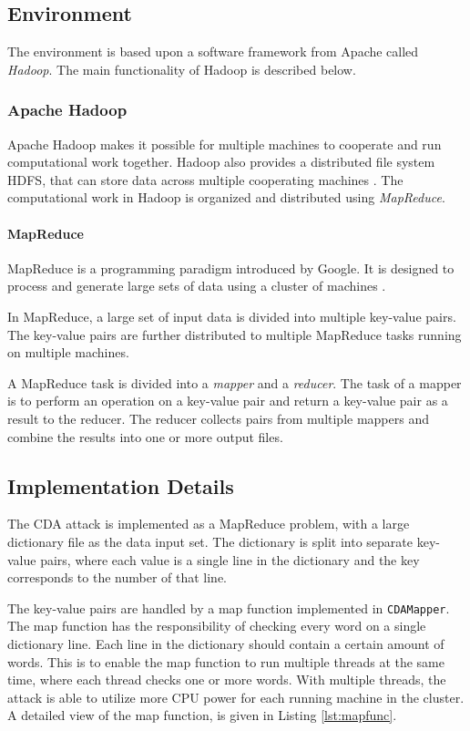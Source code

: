 \documentclass[pdftex,english,10pt,b5paper,twoside]{book}
\begin{document}
\subsection{Environment}

The environment is based upon a software framework from Apache called
\emph{Hadoop}. The main functionality of Hadoop is described below.

\subsubsection{Apache Hadoop}

Apache Hadoop makes it possible for multiple machines to cooperate
and run computational work together. Hadoop also provides a distributed file system
\ac{HDFS}, that can store data across multiple cooperating machines \cite{hadoop}. The
computational work in Hadoop is organized and distributed using \emph{MapReduce}.

\paragraph{MapReduce} MapReduce is a programming paradigm introduced by Google.
It is designed to process and generate large sets of data using a cluster of
machines \cite{mapred}.

In MapReduce, a large set of input data is divided into multiple key-value
pairs. The key-value pairs are further distributed to multiple MapReduce tasks
running on multiple machines.

A MapReduce task is divided into a \emph{mapper} and a \emph{reducer}. The task
of a mapper is to perform an operation on a key-value pair and return a
key-value pair as a result to the reducer. The reducer collects pairs
from multiple mappers and combine the results into one or more output files.

\subsection{Implementation Details}

The \ac{CDA} attack is implemented as a MapReduce problem, with a large
dictionary file as the data input set. The dictionary is split into separate
key-value pairs, where each value is a single line in the dictionary and the
key corresponds to the number of that line.

The key-value pairs are handled by a map function implemented in
\texttt{CDAMapper}. The
map function has the responsibility of checking every word on a single
dictionary line. Each line in the dictionary should contain a certain amount of
words. This is to enable the map function to run multiple threads at the same
time, where each thread checks one or more words. With multiple threads, the
attack is able to utilize more \ac{CPU} power for each running machine in the
cluster. A detailed view of the map function, is given in Listing
\ref{lst:mapfunc}.
\end{document}
